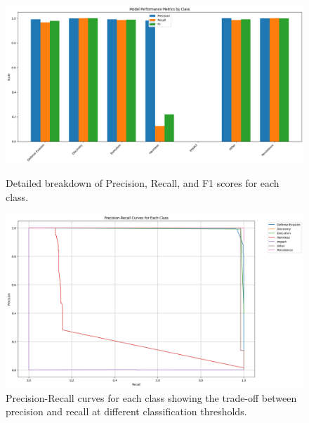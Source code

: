         \begin{figure}[h]
            \centering
            \begin{minipage}[c]{0.47\textwidth}
                \centering
                \includegraphics[width=\textwidth]{../figures/plots/section4/performance_metrics.png}
                \caption{Detailed breakdown of Precision, Recall, and F1 scores for each class.}
                \label{fig:performance_metrics}
            \end{minipage}
            \hfill
            \begin{minipage}[c]{0.47\textwidth}
                \centering
                \includegraphics[width=\textwidth]{../figures/plots/section4/precision_recall_curves.png}
                \caption{Precision-Recall curves for each class showing the trade-off between precision and recall at different classification thresholds.}
                \label{fig:pr_curves}
            \end{minipage}
        \end{figure}
        

